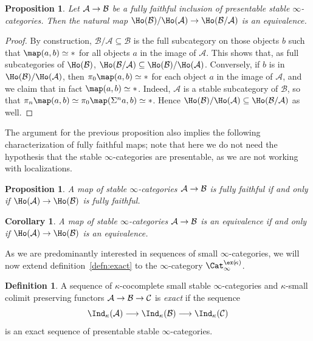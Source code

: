 \documentclass{amsart}
\renewcommand{\to}{\mathchoice{\longrightarrow}{\rightarrow}{\rightarrow}{\rightarrow}}
\let\catsymbfont\mathcal
\newcommand{\aA}{{\catsymbfont{A}}}
\newcommand{\aB}{{\catsymbfont{B}}}
\newcommand{\aC}{{\catsymbfont{C}}}
\newcommand{\kstabcat}{\Cat_\i^{\ex(\!\kappa)}}
\renewcommand{\i}{\infty}
\numberwithin{equation}{section}
\newtheorem{corollary}[equation]{Corollary}
\newtheorem{proposition}[equation]{Proposition}
\theoremstyle{definition}
\newtheorem{definition}[equation]{Definition}
\begin{document}
\begin{proposition}\label{prop:quotient}
Let $\aA\to\aB$ be a fully faithful inclusion of presentable stable
$\i$-categories.  Then the natural map
$\Ho(\aB)/\Ho(\aA)\to\Ho(\aB/\aA)$ is an equivalence. 
\end{proposition}

\begin{proof}
By construction, $\aB/\aA\subseteq\aB$ is the full subcategory on
those objects $b$ such that $\map(a,b)\simeq *$ for all objects $a$ in
the image of $\aA$. This shows that, as full subcategories of
$\Ho(\aB)$, $\Ho(\aB/\aA)\subseteq\Ho(\aB)/\Ho(\aA)$. Conversely, if
$b$ is in $\Ho(\aB)/\Ho(\aA)$, then $\pi_0\map(a,b)\simeq\ast$ for
each object $a$ in the image of $\aA$, and we claim that in fact
$\map(a,b)\simeq *$. Indeed, $\aA$ is a stable subcategory of $\aB$,
so that $\pi_n\map(a,b)\simeq\pi_0\map(\Sigma^n a,b)\simeq\ast$. Hence
$\Ho(\aB)/\Ho(\aA)\subseteq\Ho(\aB/\aA)$ as well. 
\end{proof}

The argument for the previous proposition also implies the following
characterization of fully faithful maps; note that here we do not need
the hypothesis that the stable $\i$-categories are presentable, as we
are not working with localizations.

\begin{proposition}\label{prop:full}
A map of stable $\i$-categories $\aA\to\aB$ is fully faithful if and
only if $\Ho(\aA)\to\Ho(\aB)$ is fully faithful.
\end{proposition}

\begin{corollary}\label{cor:equiv}
A map of stable $\i$-categories $\aA\to\aB$ is an equivalence if and
only if $\Ho(\aA)\to\Ho(\aB)$ is an equivalence. 
\end{corollary}

As we are predominantly interested in sequences of small
$\i$-categories, we will now extend definition~\ref{defn:exact} to the
$\i$-category $\kstabcat$.

\begin{definition}\label{def:exact}
A sequence of $\kappa$-cocomplete small stable $\i$-categories and
$\kappa$-small colimit preserving functors $\aA \to \aB \to \aC$ is
{\em exact} if the sequence
\[
\Ind_\kappa(\aA)\to\Ind_\kappa(\aB)\to\Ind_\kappa(\aC)
\]
is an exact sequence of presentable stable $\i$-categories.
\end{definition}
\end{document}
